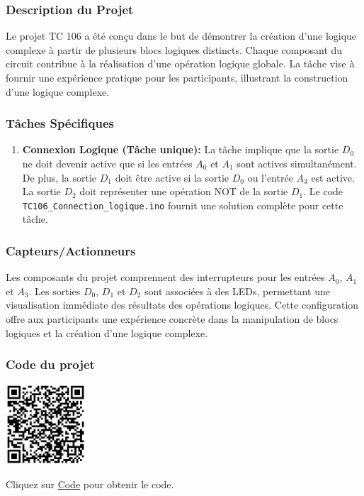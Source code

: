 \documentclass[a4paper,12pt]{report}
\begin{document}
\subsubsection{Description du Projet}

Le projet TC 106 a été conçu dans le but de démontrer la création d'une logique complexe à partir de plusieurs blocs logiques distincts. Chaque composant du circuit contribue à la réalisation d'une opération logique globale. La tâche vise à fournir une expérience pratique pour les participants, illustrant la construction d'une logique complexe.

\subsubsection{Tâches Spécifiques}

\begin{enumerate}
    \item \textbf{Connexion Logique (Tâche unique):} La tâche implique que la sortie \(D_0\) ne doit devenir active que si les entrées \(A_0\) et \(A_1\) sont actives simultanément. De plus, la sortie \(D_1\) doit être active si la sortie \(D_0\) ou l'entrée \(A_3\) est active. La sortie \(D_2\) doit représenter une opération NOT de la sortie \(D_1\). Le code \texttt{TC106\_Connection\_logique.ino} fournit une solution complète pour cette tâche.
\end{enumerate}

\subsubsection{Capteurs/Actionneurs}

Les composants du projet comprennent des interrupteurs pour les entrées \(A_0\), \(A_1\) et \(A_3\). Les sorties \(D_0\), \(D_1\) et \(D_2\) sont associées à des LEDs, permettant une visualisation immédiate des résultats des opérations logiques. Cette configuration offre aux participants une expérience concrète dans la manipulation de blocs logiques et la création d'une logique complexe.

\subsubsection{Code du projet}

\begin{minipage}{0.5\textwidth}
    \includegraphics[height=3cm]{Code TC106.png}
\end{minipage}%
\begin{minipage}{0.5\textwidth}
    Cliquez sur \href{https://github.com/DexterTaha/Controllino-PLC-Sample/blob/main/TC100/TC106_Connection_logique/TC106_Connection_logique.ino}{Code} pour obtenir le code.
\end{minipage}
\newpage
\end{document}
